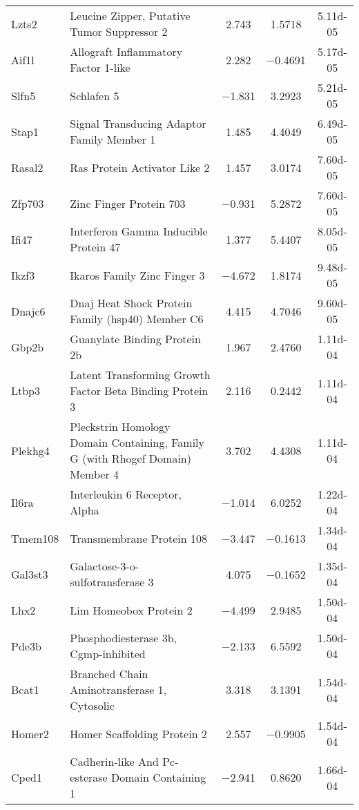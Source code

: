 {\begin{longtable}[l]{p{2.5cm}p{6.6cm}ccc}
Lzts2	& Leucine Zipper, Putative Tumor Suppressor 2	& \num{ 2.743}	& \num{ 1.5718}	& \num{5.11d-05}\\ 
Aif1l	& Allograft Inflammatory Factor 1-like	& \num{ 2.282}	& \num{-0.4691}	& \num{5.17d-05}\\ 
Slfn5	& Schlafen 5	& \num{-1.831}	& \num{ 3.2923}	& \num{5.21d-05}\\ 
Stap1	& Signal Transducing Adaptor Family Member 1	& \num{ 1.485}	& \num{ 4.4049}	& \num{6.49d-05}\\ 
Rasal2	& Ras Protein Activator Like 2	& \num{ 1.457}	& \num{ 3.0174}	& \num{7.60d-05}\\ 
Zfp703	& Zinc Finger Protein 703	& \num{-0.931}	& \num{ 5.2872}	& \num{7.60d-05}\\ 
Ifi47	& Interferon Gamma Inducible Protein 47	& \num{ 1.377}	& \num{ 5.4407}	& \num{8.05d-05}\\ 
Ikzf3	& Ikaros Family Zinc Finger 3	& \num{-4.672}	& \num{ 1.8174}	& \num{9.48d-05}\\ 
Dnajc6	& Dnaj Heat Shock Protein Family (hsp40) Member C6	& \num{ 4.415}	& \num{ 4.7046}	& \num{9.60d-05}\\ 
Gbp2b	& Guanylate Binding Protein 2b	& \num{ 1.967}	& \num{ 2.4760}	& \num{1.11d-04}\\ 
Ltbp3	& Latent Transforming Growth Factor Beta Binding Protein 3	& \num{ 2.116}	& \num{ 0.2442}	& \num{1.11d-04}\\ 
Plekhg4	& Pleckstrin Homology Domain Containing, Family G (with Rhogef Domain) Member 4	& \num{ 3.702}	& \num{ 4.4308}	& \num{1.11d-04}\\ 
Il6ra	& Interleukin 6 Receptor, Alpha	& \num{-1.014}	& \num{ 6.0252}	& \num{1.22d-04}\\ 
Tmem108	& Transmembrane Protein 108	& \num{-3.447}	& \num{-0.1613}	& \num{1.34d-04}\\ 
Gal3st3	& Galactose-3-o-sulfotransferase 3	& \num{ 4.075}	& \num{-0.1652}	& \num{1.35d-04}\\ 
Lhx2	& Lim Homeobox Protein 2	& \num{-4.499}	& \num{ 2.9485}	& \num{1.50d-04}\\ 
Pde3b	& Phosphodiesterase 3b, Cgmp-inhibited	& \num{-2.133}	& \num{ 6.5592}	& \num{1.50d-04}\\ 
Bcat1	& Branched Chain Aminotransferase 1, Cytosolic	& \num{ 3.318}	& \num{ 3.1391}	& \num{1.54d-04}\\ 
Homer2	& Homer Scaffolding Protein 2	& \num{ 2.557}	& \num{-0.9905}	& \num{1.54d-04}\\ 
Cped1	& Cadherin-like And Pc-esterase Domain Containing 1	& \num{-2.941}	& \num{ 0.8620}	& \num{1.66d-04}\\ 

\end{longtable}}
